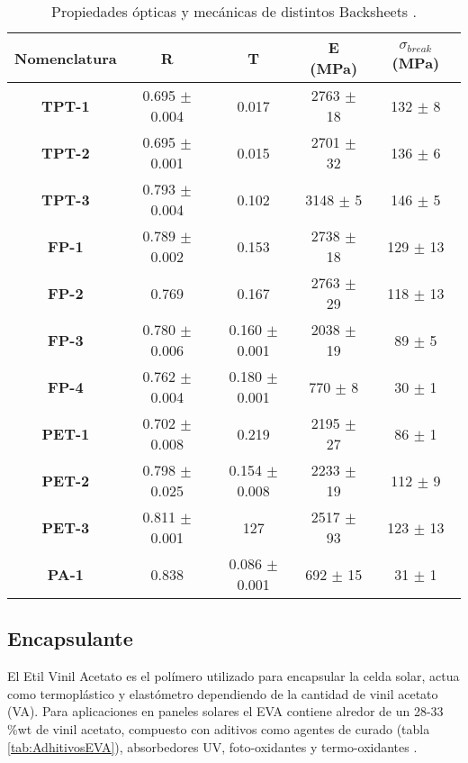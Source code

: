 \begin{table}[htb]
	\caption{Propiedades ópticas y mecánicas de distintos Backsheets \citep{Klaus2016}.}
	\vspace{-0.5em} %
	\label{tab:BSPropiedades}
	\begin{center}
		\begin{tabular}{c||c|c|c|c}\hline
			\textbf{Nomenclatura} & \textbf{R} & \textbf{T} & \textbf{E (MPa)} & \textbf{$\sigma_{break}$ (MPa)} \\ \hline
			\textbf{TPT-1} & 0.695 $\pm$ 0.004 & 0.017 & 2763 $\pm$ 18 & 132 $\pm$ 8 \\ \hline
			\textbf{TPT-2} & 0.695 $\pm$ 0.001 & 0.015 & 2701 $\pm$ 32 & 136 $\pm$ 6 \\ \hline
			\textbf{TPT-3} & 0.793 $\pm$ 0.004 & 0.102 & 3148 $\pm$ 5 & 146 $\pm$ 5 \\ \hline
			\textbf{FP-1} & 0.789 $\pm$ 0.002 & 0.153 & 2738 $\pm$ 18 & 129 $\pm$ 13 \\ \hline
			\textbf{FP-2} & 0.769 & 0.167 & 2763 $\pm$ 29 & 118 $\pm$ 13 \\ \hline
			\textbf{FP-3} & 0.780 $\pm$ 0.006 & 0.160 $\pm$ 0.001 & 2038 $\pm$ 19 & 89 $\pm$ 5 \\ \hline
			\textbf{FP-4} & 0.762 $\pm$ 0.004 & 0.180 $\pm$ 0.001 & 770 $\pm$ 8 & 30 $\pm$ 1 \\ \hline
			\textbf{PET-1} & 0.702 $\pm$ 0.008 & 0.219 & 2195 $\pm$ 27 & 86 $\pm$ 1  \\ \hline
			\textbf{PET-2} & 0.798 $\pm$ 0.025 & 0.154 $\pm$ 0.008 & 2233 $\pm$ 19 & 112 $\pm$ 9 \\ \hline
			\textbf{PET-3} & 0.811 $\pm$ 0.001 & 127 & 2517 $\pm$ 93 & 123 $\pm$ 13 \\ \hline
			\textbf{PA-1} & 0.838 & 0.086 $\pm$ 0.001 & 692 $\pm$ 15 & 31 $\pm$ 1 \\ \hline      
		\end{tabular}
	\end{center}
\end{table} 

 \subsection{Encapsulante}
\label{sec:encapsulante} 

El Etil Vinil Acetato es el polímero utilizado para encapsular la celda solar, actua como termoplástico y elastómetro dependiendo de la cantidad de vinil acetato (VA). Para aplicaciones en paneles solares el EVA contiene alredor de un 28-33 \%wt de vinil acetato, compuesto con aditivos como agentes de curado (tabla \ref{tab:AdhitivosEVA}), absorbedores UV, foto-oxidantes y termo-oxidantes \citep{Badiee2016}. 

